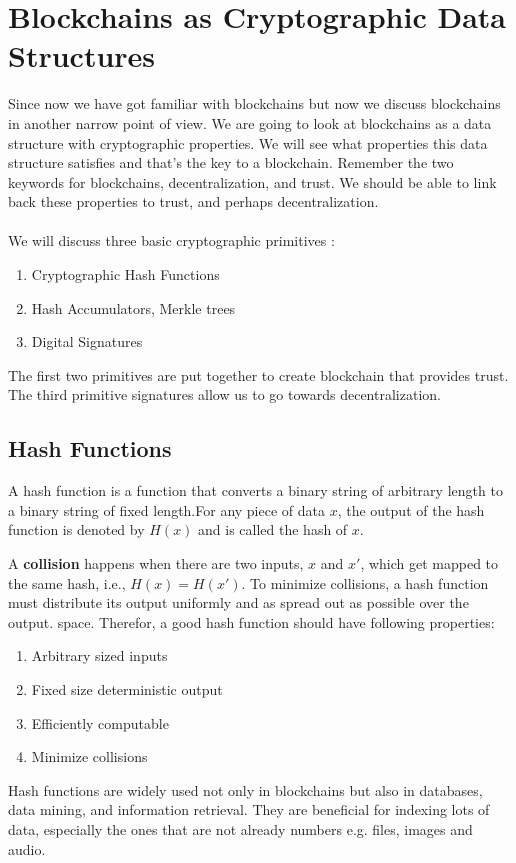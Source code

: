 \chapter{Blockchains as Cryptographic Data Structures}
Since now we have got familiar with blockchains but now we discuss blockchains in another narrow point of view. We are going to look at blockchains as a data structure with cryptographic properties. We will see what properties this data structure satisfies and that's the key to a blockchain. Remember the two keywords for blockchains, decentralization, and trust.  We should be able to link back these properties to trust, and perhaps decentralization.\\\\
We will discuss three basic cryptographic primitives :
\begin{enumerate}
	\item Cryptographic Hash Functions
	\item Hash Accumulators, Merkle trees
	\item Digital Signatures
\end{enumerate}
The first two primitives are put together to create blockchain that provides trust. The third primitive signatures allow us to go towards decentralization.
\section{Hash Functions}
A hash function is a function that converts a binary string of arbitrary length to a binary string of fixed length.For any piece of data $x$, the output of the hash function is denoted by $H(x)$ and is called the hash of $x$. 

A \textbf{collision} happens when there are two inputs, $x$ and $x'$, which get mapped to the same hash, i.e., $H(x) = H(x')$.
To minimize collisions, a hash function must distribute its output uniformly and as spread out as possible over the output. space. Therefor, a good hash function should have following properties:
\begin{enumerate}
	\item Arbitrary sized inputs
	\item Fixed size deterministic output
	\item Efficiently computable
	\item Minimize collisions
\end{enumerate}
Hash functions are widely used not only in blockchains but also in databases, data mining, and information retrieval. They are beneficial for indexing lots of data, especially the ones that are not already numbers e.g. files, images and audio.
